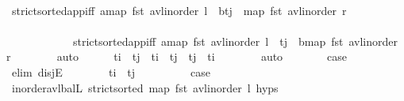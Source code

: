 \begin{isabellebody}
\ \ \ \ \ \ \isamarkupfalse%
\ strict{\isacharunderscore}{\kern0pt}sorted{\isacharunderscore}{\kern0pt}app{\isacharunderscore}{\kern0pt}iff{\isacharbrackleft}{\kern0pt}\ a{\isacharequal}{\kern0pt}{\isachardoublequoteopen}map\ fst\ {\isacharparenleft}{\kern0pt}avl{\isacharunderscore}{\kern0pt}inorder\ l{\isacharparenright}{\kern0pt}{\isachardoublequoteclose}\ \ b{\isacharequal}{\kern0pt}{\isachardoublequoteopen}t\isactrlsub j\ {\isacharhash}{\kern0pt}\ map\ fst\ {\isacharparenleft}{\kern0pt}avl{\isacharunderscore}{\kern0pt}inorder\ r{\isacharparenright}{\kern0pt}{\isachardoublequoteclose}{\isacharbrackright}{\kern0pt}\ \ \ \ \ \ \ \ \ \ \ \ \isanewline
\ \ \ \ \ \ \ \ \ \ \ \ strict{\isacharunderscore}{\kern0pt}sorted{\isacharunderscore}{\kern0pt}app{\isacharunderscore}{\kern0pt}iff{\isacharbrackleft}{\kern0pt}\ a{\isacharequal}{\kern0pt}{\isachardoublequoteopen}map\ fst\ {\isacharparenleft}{\kern0pt}avl{\isacharunderscore}{\kern0pt}inorder\ l{\isacharparenright}{\kern0pt}\ {\isacharat}{\kern0pt}\ {\isacharbrackleft}{\kern0pt}t\isactrlsub j{\isacharbrackright}{\kern0pt}{\isachardoublequoteclose}\ \ b{\isacharequal}{\kern0pt}{\isachardoublequoteopen}map\ fst\ {\isacharparenleft}{\kern0pt}avl{\isacharunderscore}{\kern0pt}inorder\ r{\isacharparenright}{\kern0pt}{\isachardoublequoteclose}{\isacharbrackright}{\kern0pt}\isanewline
\ \ \ \ \ \ \isamarkupfalse%
\ auto\isanewline
\ \ \ \ \isamarkupfalse%
\ {\isachardoublequoteopen}t\isactrlsub i\ {\isacharless}{\kern0pt}\ t\isactrlsub j\ {\isasymor}\ t\isactrlsub i\ {\isacharequal}{\kern0pt}\ t\isactrlsub j\ {\isasymor}\ t\isactrlsub j\ {\isacharless}{\kern0pt}\ t\isactrlsub i{\isachardoublequoteclose}\isanewline
\ \ \ \ \ \ \isamarkupfalse%
\ auto\isanewline
\ \ \ \ \isamarkupfalse%
\ \isamarkupfalse%
\ {\isacharquery}{\kern0pt}case\isanewline
\ \ \ \ \isamarkupfalse%
\ {\isacharparenleft}{\kern0pt}elim\ disjE{\isacharparenright}{\kern0pt}\isanewline
\ \ \ \ \ \ \isamarkupfalse%
\ {\isachardoublequoteopen}t\isactrlsub i\ {\isacharless}{\kern0pt}\ t\isactrlsub j{\isachardoublequoteclose}\isanewline
\ \ \ \ \ \ \isamarkupfalse%
\ \isamarkupfalse%
\ {\isacharquery}{\kern0pt}case\isanewline
\ \ \ \ \ \ \ \ \isamarkupfalse%
\ inorder{\isacharunderscore}{\kern0pt}avl{\isacharunderscore}{\kern0pt}balL\ {\isacartoucheopen}strict{\isacharunderscore}{\kern0pt}sorted\ {\isacharparenleft}{\kern0pt}map\ fst\ {\isacharparenleft}{\kern0pt}avl{\isacharunderscore}{\kern0pt}inorder\ l{\isacharparenright}{\kern0pt}{\isacharparenright}{\kern0pt}{\isacartoucheclose}\ {\isachardoublequoteopen}{}{\isachardot}{\kern0pt}hyps{\isachardoublequoteclose}\ \isamarkupfalse%

\end{isabellebody}
